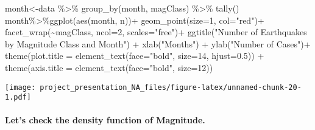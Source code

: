 \documentclass[
]{article}
\newenvironment{Shaded}{\begin{snugshade}}{\end{snugshade}}
\newcommand{\AttributeTok}[1]{\textcolor[rgb]{0.77,0.63,0.00}{#1}}
\newcommand{\DecValTok}[1]{\textcolor[rgb]{0.00,0.00,0.81}{#1}}
\newcommand{\FloatTok}[1]{\textcolor[rgb]{0.00,0.00,0.81}{#1}}
\newcommand{\FunctionTok}[1]{\textcolor[rgb]{0.00,0.00,0.00}{#1}}
\newcommand{\NormalTok}[1]{#1}
\newcommand{\OtherTok}[1]{\textcolor[rgb]{0.56,0.35,0.01}{#1}}
\newcommand{\SpecialCharTok}[1]{\textcolor[rgb]{0.00,0.00,0.00}{#1}}
\newcommand{\StringTok}[1]{\textcolor[rgb]{0.31,0.60,0.02}{#1}}
\begin{document}
\begin{Shaded}
\begin{Highlighting}[]
\NormalTok{month}\OtherTok{\textless{}{-}}\NormalTok{data }\SpecialCharTok{\%\textgreater{}\%} \FunctionTok{group\_by}\NormalTok{(month, magClass) }\SpecialCharTok{\%\textgreater{}\%} \FunctionTok{tally}\NormalTok{()}
\NormalTok{month}\SpecialCharTok{\%\textgreater{}\%}\FunctionTok{ggplot}\NormalTok{(}\FunctionTok{aes}\NormalTok{(month, n))}\SpecialCharTok{+}
\FunctionTok{geom\_point}\NormalTok{(}\AttributeTok{size=}\DecValTok{1}\NormalTok{, }\AttributeTok{col=}\StringTok{"red"}\NormalTok{)}\SpecialCharTok{+}
  \FunctionTok{facet\_wrap}\NormalTok{(}\SpecialCharTok{\textasciitilde{}}\NormalTok{magClass,  }\AttributeTok{ncol=}\DecValTok{2}\NormalTok{, }\AttributeTok{scales=}\StringTok{"free"}\NormalTok{)}\SpecialCharTok{+}
   \FunctionTok{ggtitle}\NormalTok{(}\StringTok{"Number of Earthquakes by Magnitude Class and Month"}\NormalTok{) }\SpecialCharTok{+}
           \FunctionTok{xlab}\NormalTok{(}\StringTok{"Months"}\NormalTok{) }\SpecialCharTok{+} \FunctionTok{ylab}\NormalTok{(}\StringTok{"Number of Cases"}\NormalTok{)}\SpecialCharTok{+}
  \FunctionTok{theme}\NormalTok{(}\AttributeTok{plot.title =} \FunctionTok{element\_text}\NormalTok{(}\AttributeTok{face=}\StringTok{"bold"}\NormalTok{, }\AttributeTok{size=}\DecValTok{14}\NormalTok{, }\AttributeTok{hjust=}\FloatTok{0.5}\NormalTok{)) }\SpecialCharTok{+}
\FunctionTok{theme}\NormalTok{(}\AttributeTok{axis.title =} \FunctionTok{element\_text}\NormalTok{(}\AttributeTok{face=}\StringTok{"bold"}\NormalTok{, }\AttributeTok{size=}\DecValTok{12}\NormalTok{))}
\end{Highlighting}
\end{Shaded}

\texttt{[image: project\_presentation\_NA\_files/figure-latex/unnamed-chunk-20-1.pdf]}

\hypertarget{lets-check-the-density-function-of-magnitude.}{%
\paragraph{Let's check the density function of
Magnitude.}\label{lets-check-the-density-function-of-magnitude.}}

\begin{Shaded}
\end{Shaded}
\end{document}
